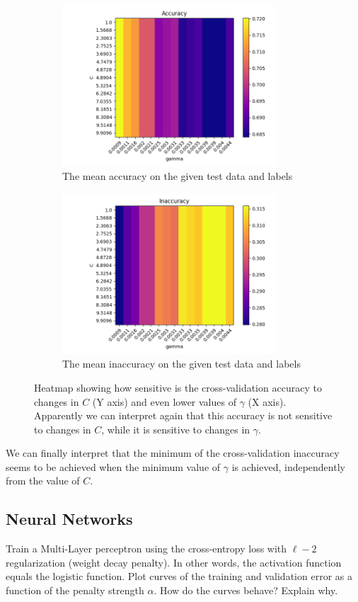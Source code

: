 \documentclass[12pt,letterpaper]{article}
\begin{document}
\begin{figure}[H]
    \begin{subfigure}{0.5\textwidth}
    \includegraphics[width=8cm]{images/accuracy_3.jpg} 
    \caption{The mean accuracy on the given test data and labels}
    \label{fig:subfig3}
    \end{subfigure}
    \begin{subfigure}{0.5\textwidth}
    \includegraphics[width=8cm]{images/inaccuracy_3.jpg}
    \caption{The mean inaccuracy on the given test data and labels}
    \label{fig:subfiig4}
    \end{subfigure}
    \caption{Heatmap showing how sensitive is the cross-validation accuracy to changes in $C$ (Y axis) and even lower values of $\gamma$ (X axis). Apparently we can interpret again that this accuracy is not sensitive to changes in $C$, while it is sensitive to changes in $\gamma$.}
\end{figure}

We can finally interpret that the minimum of the cross-validation inaccuracy seems to be achieved when the minimum value of $\gamma$ is achieved, independently from the value of $C$.

\newpage
\subsection*{Neural Networks}
Train a Multi-Layer perceptron using the cross-entropy loss with $\ell-2$ regularization (weight decay penalty). In other words, the activation function equals the logistic function. Plot curves of the training and validation error as a function of the penalty strength $\alpha$. How do the curves behave? Explain why.
\end{document}
